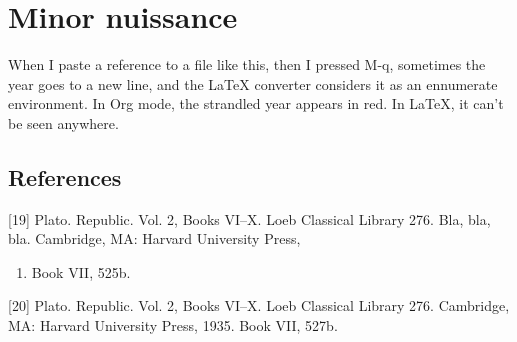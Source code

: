 \documentclass[11pt]{article}
\author{Antonio Eduardo Costa Pereira }
\date{\today}
\title{}
\begin{document}
\tableofcontents

\section{Minor nuissance}
\label{sec:org458e3af}
When I paste a reference to a file like this, then I pressed M-q, sometimes the year goes to a new line, and the \LaTeX{} converter considers it as an ennumerate environment. In Org mode, the strandled year appears in red. In \LaTeX{}, it can't be seen anywhere.
\subsection{References}
\label{sec:orgda73d25}

{[}19] Plato. Republic. Vol. 2, Books VI–X. Loeb Classical Library 276.
Bla, bla, bla. Cambridge, MA: Harvard University Press,
\begin{enumerate}
\item Book VII, 525b.
\end{enumerate}

{[}20] Plato. Republic. Vol. 2, Books VI–X.  Loeb Classical Library 276. Cambridge, MA: Harvard University Press, 1935. Book VII, 527b.
\end{document}
